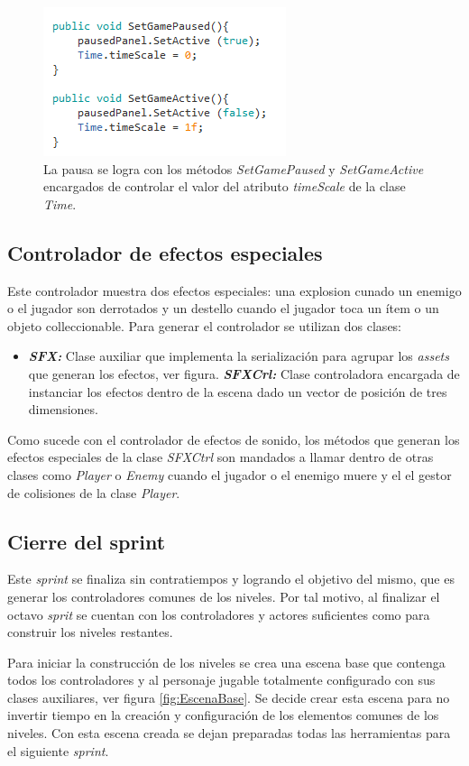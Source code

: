 \begin{figure}[h]
		\centering
		\includegraphics[height=0.2 \textheight]{03TrabajoRealizado/imagenes/Paused.png}
		\caption{La pausa se logra con los métodos \textit{SetGamePaused} y 
		\textit{SetGameActive} encargados de controlar el valor del atributo 
		\textit{timeScale} de la clase \textit{Time}.}
		\label{fig:pauseMethods}
	\end{figure} 
	
\subsection{Controlador de efectos especiales}
Este controlador muestra dos efectos especiales: una explosion cunado un enemigo o el jugador son derrotados y un destello cuando el jugador toca un ítem o un objeto colleccionable. Para generar el controlador se utilizan dos clases:

\begin{itemize}
	\item \textit{\textbf{SFX:}} Clase auxiliar que implementa la serialización para agrupar los \textit{assets} que generan los efectos, ver figura.
	\textit{\textbf{SFXCrl:}} Clase controladora encargada de instanciar los efectos dentro de la escena dado un vector de posición de tres dimensiones.
\end{itemize}

Como sucede con el controlador de efectos de sonido, los métodos que generan los efectos especiales de la clase \textit{SFXCtrl} son mandados a llamar dentro de otras clases como \textit{Player} o \textit{Enemy} cuando el jugador o el enemigo muere y el el gestor de colisiones de la clase \textit{Player}.

\subsection{Cierre del sprint}
Este \textit{sprint} se finaliza sin contratiempos y logrando el objetivo del 
mismo, que es generar los controladores comunes de los niveles. Por tal motivo, al 
finalizar el octavo \textit{sprit} se cuentan con los controladores y actores 
suficientes como para construir los niveles restantes. 
\\
\par
Para iniciar la construcción de los niveles se crea una escena base que contenga 
todos los controladores y al personaje jugable totalmente configurado con sus 
clases auxiliares, ver figura \ref{fig:EscenaBase}. Se decide crear esta escena 
para no invertir tiempo en la creación y configuración de los elementos comunes 
de los niveles. Con esta escena creada se dejan preparadas todas las herramientas 
para el siguiente \textit{sprint}.

